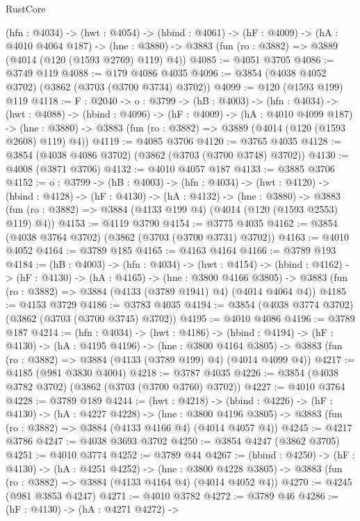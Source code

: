 \begin{lexlean}{RustCore}
\begin{coremodule}
  (hfn : @4034) ->
  (hwt : @4054) ->
  (hbind : @4061) ->
  (hF : @4009) ->
  (hA : @4010 @4064 @187) ->
  (hne : @3880) -> @3883 (fun (ro : @3882) => @3889 (@4014 (@120 (@1593 @2769) @119) @4))
@4085 := @4051 @3705
@4086 := @3749 @119
@4088 := @179 @4086 @4035
@4096 := @3854 (@4038 @4052 @3702) (@3862 (@3703 (@3700 @3734) @3702))
@4099 := @120 (@1593 @199) @119
@4118 := {F : @2040} ->
  {o : @3799} ->
  (hB : @4003) ->
  (hfn : @4034) ->
  (hwt : @4088) ->
  (hbind : @4096) ->
  (hF : @4009) ->
  (hA : @4010 @4099 @187) ->
  (hne : @3880) -> @3883 (fun (ro : @3882) => @3889 (@4014 (@120 (@1593 @2608) @119) @4))
@4119 := @4085 @3706
@4120 := @3765 @4035
@4128 := @3854 (@4038 @4086 @3702) (@3862 (@3703 (@3700 @3748) @3702))
@4130 := @4008 (@3871 @3706)
@4132 := @4010 @4057 @187
@4133 := @3885 @3706
@4152 := {o : @3799} ->
  (hB : @4003) ->
  (hfn : @4034) ->
  (hwt : @4120) ->
  (hbind : @4128) ->
  (hF : @4130) ->
  (hA : @4132) ->
  (hne : @3880) ->
  @3883 (fun (ro : @3882) => @3884 (@4133 @199 @4) (@4014 (@120 (@1593 @2553) @119) @4))
@4153 := @4119 @3790
@4154 := @3775 @4035
@4162 := @3854 (@4038 @3764 @3702) (@3862 (@3703 (@3700 @3731) @3702))
@4163 := @4010 @4052
@4164 := @3789 @185
@4165 := @4163 @4164
@4166 := @3789 @193
@4184 := (hB : @4003) ->
  (hfn : @4034) ->
  (hwt : @4154) ->
  (hbind : @4162) ->
  (hF : @4130) ->
  (hA : @4165) ->
  (hne : @3800 @4166 @3805) ->
  @3883 (fun (ro : @3882) => @3884 (@4133 (@3789 @1941) @4) (@4014 @4064 @4))
@4185 := @4153 @3729
@4186 := @3783 @4035
@4194 := @3854 (@4038 @3774 @3702) (@3862 (@3703 (@3700 @3745) @3702))
@4195 := @4010 @4086
@4196 := @3789 @187
@4214 := (hfn : @4034) ->
  (hwt : @4186) ->
  (hbind : @4194) ->
  (hF : @4130) ->
  (hA : @4195 @4196) ->
  (hne : @3800 @4164 @3805) ->
  @3883 (fun (ro : @3882) => @3884 (@4133 (@3789 @199) @4) (@4014 @4099 @4))
@4217 := @4185 (@981 @3830 @4004)
@4218 := @3787 @4035
@4226 := @3854 (@4038 @3782 @3702) (@3862 (@3703 (@3700 @3760) @3702))
@4227 := @4010 @3764
@4228 := @3789 @189
@4244 := (hwt : @4218) ->
  (hbind : @4226) ->
  (hF : @4130) ->
  (hA : @4227 @4228) ->
  (hne : @3800 @4196 @3805) -> @3883 (fun (ro : @3882) => @3884 (@4133 @4166 @4) (@4014 @4057 @4))
@4245 := @4217 @3786
@4247 := @4038 @3693 @3702
@4250 := @3854 @4247 (@3862 @3705)
@4251 := @4010 @3774
@4252 := @3789 @44
@4267 := (hbind : @4250) ->
  (hF : @4130) ->
  (hA : @4251 @4252) ->
  (hne : @3800 @4228 @3805) -> @3883 (fun (ro : @3882) => @3884 (@4133 @4164 @4) (@4014 @4052 @4))
@4270 := @4245 (@981 @3853 @4247)
@4271 := @4010 @3782
@4272 := @3789 @46
@4286 := (hF : @4130) ->
  (hA : @4271 @4272) ->

\end{coremodule}
\end{lexlean}
